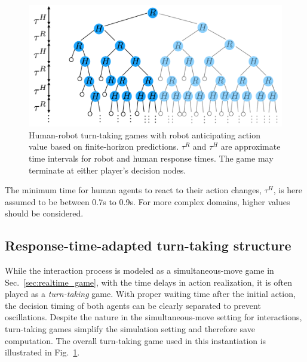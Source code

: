 \documentclass[letterpaper, 10 pt, conference]{ieeeconf}  %
\begin{document}
   \begin{figure}[t]
      \centering
      \vspace{-1em}
      \includegraphics[scale=0.2]{turn_taking}
      \vspace{-1.4em}
      \caption{
        Human-robot turn-taking games with robot anticipating action value 
        based on finite-horizon predictions. $\tau^R$ and $\tau^H$ 
  are approximate time intervals for robot and human response times. The game may 
     terminate at either player's decision nodes.}
      \vspace{-1.5em}
     \label{fig:turn_taking}
   \end{figure}
The minimum time for human agents to 
react to their action changes, $\tau^H$,
is here assumed to be between 0.7s to 0.9s. For more complex domains, higher 
values should be considered.
\vspace{-.2em}
\subsection{Response-time-adapted turn-taking structure}
\vspace{-.2em}
While the interaction process is modeled as a simultaneous-move game in 
Sec.~\ref{sec:realtime_game}, with the time delays in action realization, it 
is often played as a \textit{turn-taking} game. With proper waiting time after 
the initial action, the decision timing of both agents can be clearly 
separated to prevent oscillations. Despite the nature in the simultaneous-move 
setting for interactions, turn-taking games simplify the simulation setting 
and therefore save computation. The overall turn-taking game used in this 
instantiation is illustrated in Fig.~\ref{fig:turn_taking}.
\end{document}
